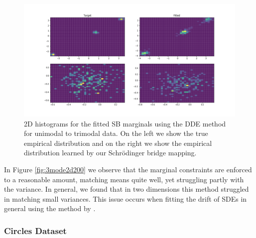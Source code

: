 \documentclass[a4paper,12pt,twoside,openright]{report}
\theoremstyle{definition}
\begin{document}
\begin{figure}
    \centering
    \includegraphics[scale=0.4,trim={2.3cm 1cm 2.5cm 0}, clip]{images/GP/2d_3mode_GP_means_3.3_3.6_0.7_std_0.1_hist_200.png}
    \caption{ 2D histograms for the fitted SB marginals using the DDE method for unimodal to trimodal data.  On the left we show the true empirical distribution and on the right we show the empirical distribution learned by our Schrödinger bridge mapping.}
    \label{fig:3mode2d200hist}
\end{figure}
In Figure \ref{fig:3mode2d200} we observe that the marginal constraints are enforced to a reasonable amount, matching means quite well, yet struggling partly with the variance. In general, we found that in two dimensions this method struggled in matching small variances. This issue occurs when fitting the drift of SDEs in general using the method by \cite{ruttor2013approximate}.

\subsubsection{Circles Dataset}
\end{document}
